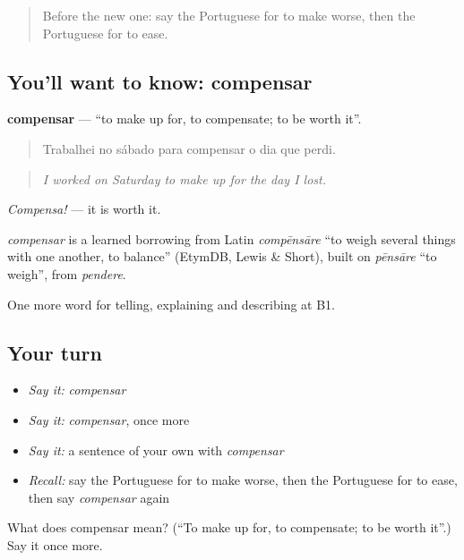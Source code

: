 \label{lesson:PT-C354-compensar}



\begin{quote}
Before the new one: say the Portuguese for to make worse, then the Portuguese for to ease.
\end{quote}

\subsection*{You'll want to know: compensar}
\textbf{compensar} — \textquotedblleft{}to make up for, to compensate; to be worth it\textquotedblright{}.

\begin{quote}
Trabalhei no sábado para compensar o dia que perdi.
\end{quote}

\begin{quote}
\emph{I worked on Saturday to make up for the day I lost.}
\end{quote}

\emph{Compensa!} — it is worth it.

\begin{cousinweb}
\emph{compensar} is a learned borrowing from Latin \emph{compēnsāre} \textquotedblleft{}to weigh several things with one another, to balance\textquotedblright{} (EtymDB, Lewis \& Short), built on \emph{pēnsāre} \textquotedblleft{}to weigh\textquotedblright{}, from \emph{pendere}.
\end{cousinweb}

\begin{grammarlens}[title={What you've built}]
One more word for telling, explaining and describing at B1.
\end{grammarlens}

\subsection*{Your turn}
\begin{itemize}
\raggedright
  \item \emph{Say it:} \emph{compensar}
  \item \emph{Say it:} \emph{compensar}, once more
  \item \emph{Say it:} a sentence of your own with \emph{compensar}
  \item \emph{Recall:} say the Portuguese for to make worse, then the Portuguese for to ease, then say \emph{compensar} again
\end{itemize}

\begin{tcolorbox}[breakable,colback=teal!4,colframe=teal!35!black,title={Before you move on}]
What does compensar mean? (\textquotedblleft{}To make up for, to compensate; to be worth it\textquotedblright{}.) Say it once more.
\end{tcolorbox}
